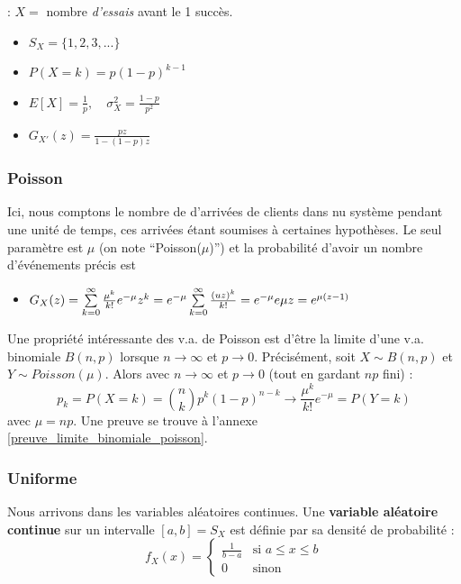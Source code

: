 \documentclass[11pt,a4paper]{article}
\numberwithin{equation}{section}
\begin{document}
 : $X =$ nombre \textit{d'essais} avant le 1 succès.
\begin{multicols}{2}
\begin{itemize}
    \item $S_X = \{1,2,3,...\}$
    \item $P(X=k) = p(1-p)^{k-1}$
    \item $E[X] = \frac{1}{p},\quad \sigma_X^2 = \frac{1-p}{p^2}$
    \item $G_{X'}(z) = \frac{pz}{1-(1-p)z}$
\end{itemize}
\end{multicols}

\subsubsection{Poisson}
Ici, nous comptons le nombre de d'arrivées de clients dans nu système pendant une unité de temps, ces arrivées étant soumises à certaines hypothèses. Le seul paramètre est $\mu$ (on note ``Poisson($\mu$)'') et la probabilité d'avoir un nombre d'événements précis est 
\begin{itemize}
    \item $G_X(z) = \sum\limits_{k=0}^{\infty}\frac{\mu^k}{k!}e^{-\mu}z^k = e^{-\mu}\sum\limits_{k=0}^{\infty}\frac{(uz)^k}{k!} = e^{-\mu}e {\mu z} = e^{\mu(z-1)}$
\end{itemize}

Une propriété intéressante des v.a. de Poisson est d'être la limite d'une v.a. binomiale $B(n,p)$ lorsque $n \to \infty$ et $p \to 0$. Précisément, soit $X \sim B(n,p)$ et $Y \sim Poisson(\mu)$. Alors avec $n\to \infty$ et $p \to 0$ (tout en gardant $np$ fini) :
\[p_k = P(X=k) = \binom{n}{k}p^k(1-p)^{n-k} \to \frac{\mu^k}{k!}e^{-\mu} = P(Y=k)\]
avec $\mu = np$. Une preuve se trouve à l'annexe \ref{preuve_limite_binomiale_poisson}.

\subsubsection{Uniforme}
Nous arrivons dans les variables aléatoires continues. Une \textbf{variable aléatoire continue} sur un intervalle $[a,b] = S_X$ est définie par sa densité de probabilité : 
\begin{equation}
    f_X(x) = \left\{
                \begin{array}{cl}
                    \frac{1}{b-a} & \text{si } a \leq x \leq b\\
                    0 & \text{sinon}
                \end{array}
            \right.
\end{equation}
\end{document}
